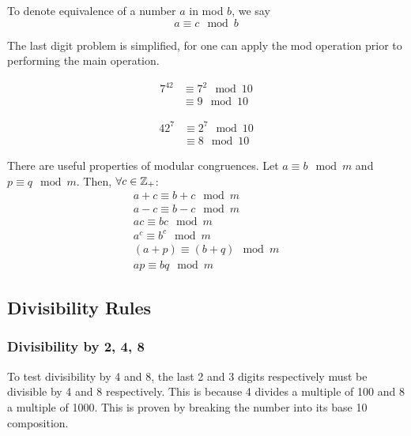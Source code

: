 To denote equivalence of a number $a$ in mod $b$, we say
\begin{equation*}
    a\equiv c\mod b
\end{equation*}
\begin{example}
    The last digit problem is simplified, for one can apply the mod operation prior to performing the main operation.
    \begin{figure}[h!]
        \centering
        \begin{minipage}[t]{.45\textwidth}
            \begin{align*}
                7^{42}&\equiv 7^2\mod 10\\
                &\equiv 9\mod 10
            \end{align*}
        \end{minipage}
        \begin{minipage}[t]{.45\textwidth}
            \begin{align*}
                42^7&\equiv 2^7\mod 10\\
                &\equiv 8\mod 10
            \end{align*}
        \end{minipage}
    \end{figure}
\end{example}
There are useful properties of modular congruences. Let $a\equiv b\mod m$ and
$p\equiv q\mod m$. Then, $\forall c\in \mathbb{Z}_+$:
\begin{gather}
    a+c\equiv b+c\mod m\\
    a-c\equiv b-c\mod m\\
    ac\equiv bc \mod m\\
    a^c\equiv b^c\mod m\\
    (a+p)\equiv (b+q)\mod m\\
    ap\equiv bq\mod m
\end{gather}

\subsection{Divisibility Rules}

\subsubsection{Divisibility by 2, 4, 8}

To test divisibility by 4 and 8, the last 2 and 3 digits respectively must be divisible by 4 and 8 respectively.
This is because 4 divides a multiple of 100 and 8 a multiple of 1000. This is proven by breaking the number into its base 10 composition.

